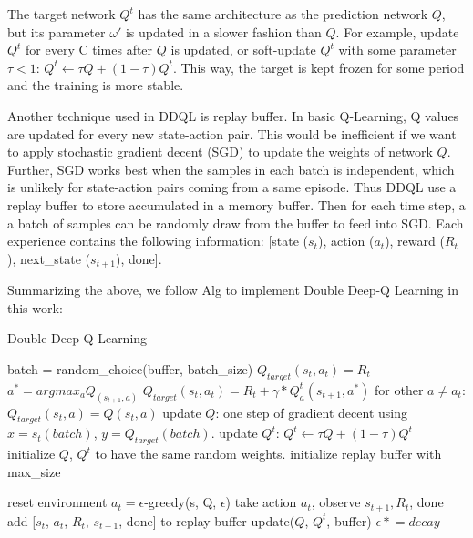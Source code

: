 \documentclass[conference]{IEEEtran}
\newcommand{\asteq}{\mathrel{*}=}
\begin{document}
The target network $Q^t$ has the same architecture as the prediction network $Q$, but its parameter $\omega'$ is updated in a slower fashion than $Q$. For example, update $Q^t$ for every C times after $Q$ is updated, or soft-update $Q^t$ with some parameter $\tau<1$:
$Q^t \leftarrow \tau Q + (1-\tau) Q^t$. This way, the target is kept frozen for some period and the training is more stable.

Another technique used in DDQL is replay buffer. In basic Q-Learning, Q values are updated for every new state-action pair. This would be inefficient if we want to apply stochastic gradient decent (SGD) to update the weights of network $Q$. Further, SGD works best when the samples in each batch is independent, which is unlikely for state-action pairs coming from a same episode. Thus DDQL use a replay buffer to store accumulated in a memory buffer. Then for each time step, a a batch of samples can be randomly draw from the buffer to feed into SGD. Each experience contains the following information: [state ($s_t$), action ($a_t$), reward ($R_t$), next\_state ($s_{t+1}$), done].

Summarizing the above, we follow Alg to implement Double Deep-Q Learning in this work:

\begin{algorithm}[h!]
	\caption{Double Deep-Q Learning}
	\begin{algorithmic}
		\State batch = random\_choice(buffer, batch\_size)
				\State $Q_{target}(s_t, a_t) = R_t$
			\Else
				\State $a^* = argmax_a Q_(s_{t+1}, a)$
				\State $Q_{target}(s_t, a_t) = R_t + \gamma * Q^t_a(s_{t+1}, a^*)$
			\EndIf
			\State for other $a\neq a_t$: $Q_{target}(s_t, a) = Q(s_t, a)$
		\EndFor
		\State update $Q$: one step of gradient decent using $x=s_t(batch)$, $y=Q_{target}(batch)$.
		\State update $Q^t$: $Q^t \leftarrow \tau Q + (1-\tau) Q^t$
		\EndFunction
		\\
		\State initialize $Q$, $Q^t$ to have the same random weights.
		\State initialize replay buffer with max\_size
		
			\State reset environment
				\State $a_t = \epsilon$-greedy(s, Q, $\epsilon$)
				\State take action $a_t$, observe $s_{t+1}, R_{t}$, done
				\State add [$s_t$, $a_t$, $R_t$, $s_{t+1}$, done] to replay buffer
				\State update($Q$, $Q^t$, buffer)
			\EndFor			
			\State $\epsilon \asteq decay$
		\EndFor
		\EndFunction
	\end{algorithmic}
	\label{algo:seq}
\end{algorithm}
\end{document}
